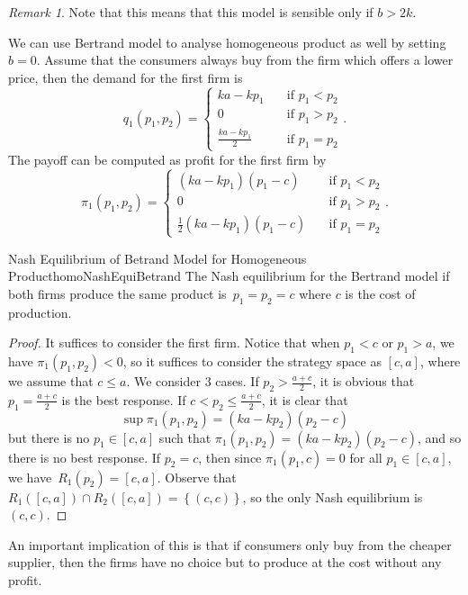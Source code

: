 \documentclass[math]{amznotes}
\theoremstyle{remark}
\newtheorem*{remark}{Remark}
\begin{document}
\begin{notebox}
    \begin{remark}
        Note that this means that this model is sensible only if $b > 2k$.
    \end{remark}
\end{notebox}
We can use Bertrand model to analyse homogeneous product as well by setting $b = 0$. Assume that the consumers always buy from the firm which offers a lower price, then the demand for the first firm is 
\begin{equation*}
    q_1\left(p_1, p_2\right) = \begin{cases}
        ka - kp_1 & \quad\textrm{if } p_1 < p_2 \\
        0 & \quad\textrm{if } p_1 > p_2 \\
        \frac{ka - kp_1}{2} & \quad\textrm{if } p_1 = p_2
    \end{cases}.
\end{equation*}
The payoff can be computed as profit for the first firm by 
\begin{equation*}
    \pi_1\left(p_1, p_2\right) = \begin{cases}
        \left(ka - kp_1\right)\left(p_1 - c\right) & \quad\textrm{if } p_1 < p_2 \\
        0 & \quad\textrm{if } p_1 > p_2 \\
        \frac{1}{2}\left(ka - kp_1\right)\left(p_1 - c\right) & \quad\textrm{if } p_1 = p_2
    \end{cases}.
\end{equation*}
\begin{probox}{\small Nash Equilibrium of Betrand Model for Homogeneous Product}{homoNashEquiBetrand}
    The Nash equilibrium for the Bertrand model if both firms produce the same product is~$p_1 = p_2 = c$ where $c$ is the cost of production.
    \tcblower
    \begin{proof}
        It suffices to consider the first firm. Notice that when $p_1 < c$ or $p_1 > a$, we have $\pi_1\left(p_1, p_2\right) < 0$, so it suffices to consider the strategy space as $\left[c, a\right]$, where we assume that $c \leq a$. We consider $3$ cases. If $p_2 > \frac{a + c}{2}$, it is obvious that $p_1 = \frac{a + c}{2}$ is the best response. If $c < p_2 \leq \frac{a + c}{2}$, it is clear that 
        \begin{equation*}
            \sup\pi_1\left(p_1, p_2\right) = \left(ka - kp_2\right)\left(p_2 - c\right)
        \end{equation*}
        but there is no $p_1 \in \left[c, a\right]$ such that $\pi_1\left(p_1, p_2\right) = \left(ka - kp_2\right)\left(p_2 - c\right)$, and so there is no best response. If $p_2 = c$, then since $\pi_1\left(p_1, c\right) = 0$ for all $p_1 \in \left[c, a\right]$, we have~$R_1\left(p_2\right) = \left[c, a\right]$. Observe that $R_1\left(\left[c, a\right]\right) \cap R_2\left(\left[c, a\right]\right) = \left\{\left(c, c\right)\right\}$, so the only Nash equilibrium is $(c, c)$.
    \end{proof}
\end{probox}
An important implication of this is that if consumers only buy from the cheaper supplier, then the firms have no choice but to produce at the cost without any profit.
\end{document}
